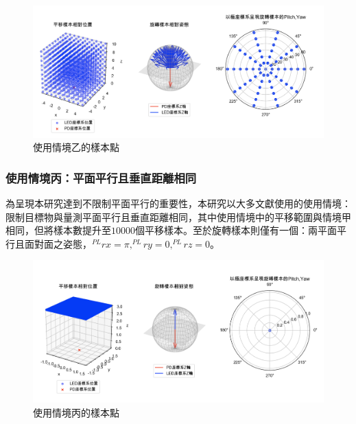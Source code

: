 \begin{figure}[htpb]
    \centering
    \includegraphics[width=15cm]{ch4pic/b_scenario.png}
    \caption{使用情境乙的樣本點}
    \label{pic:b_scenario}
\end{figure}

\subsubsection{使用情境丙：平面平行且垂直距離相同}

為呈現本研究達到不限制平面平行的重要性，本研究以大多文獻使用的使用情境：限制目標物與量測平面平行且垂直距離相同，其中使用情境中的平移範圍與情境甲相同，但將樣本數提升至$10000$個平移樣本。至於旋轉樣本則僅有一個：兩平面平行且面對面之姿態，$^{PL}rx=\pi,^{PL}ry=0,^{PL}rz=0$。

\begin{figure}[htpb]
    \centering
    \includegraphics[width=15cm]{ch4pic/c_scenario.png}
    \caption{使用情境丙的樣本點}
    \label{pic:c_scenario}
\end{figure}

